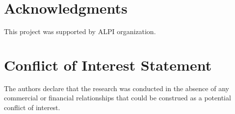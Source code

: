 \documentclass[journal]{IEEEtran}
\begin{document}
%

\section{Acknowledgments}
This project was supported by ALPI organization.

\section*{Conflict of Interest Statement}
The authors declare that the research was conducted in the absence of any commercial or financial relationships that could be construed as a potential conflict of interest.


\ifCLASSOPTIONcaptionsoff
  \newpage
\fi








%
\end{document}
